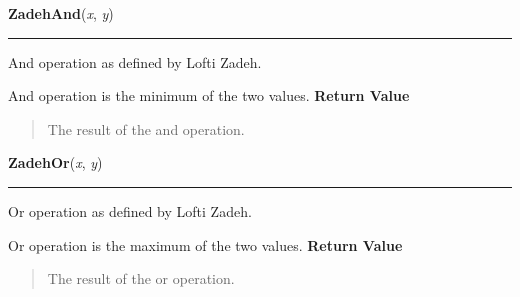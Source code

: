     \label{peach:fuzzy:norms:ZadehAnd}

    \vspace{0.5ex}

\hspace{.8\funcindent}\begin{boxedminipage}{\funcwidth}

    \raggedright \textbf{ZadehAnd}(\textit{x}, \textit{y})

    \vspace{-1.5ex}

    \rule{\textwidth}{0.5\fboxrule}
\setlength{\parskip}{2ex}

And operation as defined by Lofti Zadeh.

And operation is the minimum of the two values.
\setlength{\parskip}{1ex}
      \textbf{Return Value}
    \vspace{-1ex}

      \begin{quote}

The result of the and operation.
      \end{quote}

    \end{boxedminipage}

    \label{peach:fuzzy:norms:ZadehOr}

    \vspace{0.5ex}

\hspace{.8\funcindent}\begin{boxedminipage}{\funcwidth}

    \raggedright \textbf{ZadehOr}(\textit{x}, \textit{y})

    \vspace{-1.5ex}

    \rule{\textwidth}{0.5\fboxrule}
\setlength{\parskip}{2ex}

Or operation as defined by Lofti Zadeh.

Or operation is the maximum of the two values.
\setlength{\parskip}{1ex}
      \textbf{Return Value}
    \vspace{-1ex}

      \begin{quote}

The result of the or operation.
      \end{quote}

    \end{boxedminipage}

